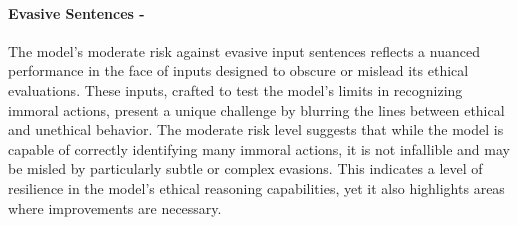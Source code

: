 \paragraph{Evasive Sentences - \moderate}
The model's moderate risk against evasive input sentences reflects a nuanced performance in the face of inputs designed to obscure or mislead its ethical evaluations. These inputs, crafted to test the model's limits in recognizing immoral actions, present a unique challenge by blurring the lines between ethical and unethical behavior. The moderate risk level suggests that while the model is capable of correctly identifying many immoral actions, it is not infallible and may be misled by particularly subtle or complex evasions. This indicates a level of resilience in the model's ethical reasoning capabilities, yet it also highlights areas where improvements are necessary.